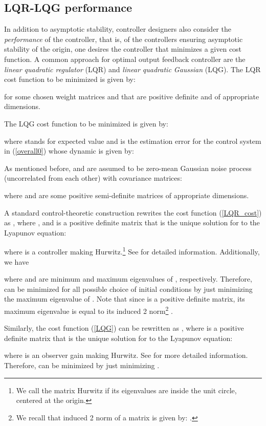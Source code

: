 \documentclass{amsart}
\numberwithin{equation}{section}
\begin{document}
\subsection{LQR-LQG performance}
In addition to asymptotic stability, controller designers also consider the {\em performance} of the controller,
that is, of the controllers ensuring asymptotic stability of the origin, one desires the controller that minimizes
a given cost function.
A common approach for optimal output feedback controller are the {\em linear quadratic regulator} (LQR) and {\em linear quadratic Gaussian} (LQG). 
The LQR cost function to be minimized is given by:

for some chosen weight matrices  and  that are positive definite and of appropriate dimensions. 

The LQG cost function to be minimized is given by:

where  stands for expected value and  is the estimation error for the control system in (\ref{overall0}) whose dynamic is given by:

As mentioned before,  and  are assumed to be zero-mean Gaussian noise process (uncorrelated from each other) with covariance matrices:

where  and  are some positive semi-definite matrices of appropriate dimensions.

A standard control-theoretic construction rewrites the cost function (\ref{LQR_cost}) as , where , and  is a positive definite matrix that is the unique solution for  to the Lyapunov equation:

where  is a controller making  Hurwitz.\footnote{
We call the matrix  Hurwitz if its eigenvalues are inside the unit circle, centered at the origin.} 
See \cite{joao} for detailed information. Additionally, we have

where  and  are minimum and maximum eigenvalues of , respectively. 
Therefore,  can be minimized for all possible choice of initial conditions by just minimizing the maximum eigenvalue of . Note that since  is a positive definite matrix, its maximum eigenvalue is equal to its induced 2 norm\footnote{We recall that induced 2 norm of a matrix  is given by: .} .  

Similarly, the cost function (\ref{LQG}) can be rewritten as , where  is a positive definite matrix that is the unique solution for  to the Lyapunov equation:

where  is an observer gain making  Hurwitz. See \cite{joao} for more detailed information. Therefore,  can be minimized by just minimizing .
\end{document}
